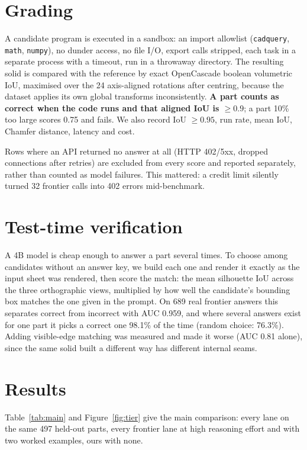 \documentclass[11pt]{article}
\begin{document}
\section{Grading}
\label{sec:grading}

A candidate program is executed in a sandbox: an import allowlist (\texttt{cadquery}, \texttt{math},
\texttt{numpy}), no dunder access, no file I/O, export calls stripped, each task in a separate process with a
timeout, run in a throwaway directory. The resulting solid is compared with the reference by exact OpenCascade
boolean volumetric IoU, maximised over the 24 axis-aligned rotations after centring, because the dataset applies its
own global transforms inconsistently. \textbf{A part counts as correct when the code runs and that aligned IoU is
$\ge0.9$}; a part 10\% too large scores 0.75 and fails. We also record IoU $\ge 0.95$, run rate, mean IoU, Chamfer
distance, latency and cost.

Rows where an API returned no answer at all (HTTP 402/5xx, dropped connections after retries) are excluded from every
score and reported separately, rather than counted as model failures. This mattered: a credit limit silently turned
32 frontier calls into 402 errors mid-benchmark.

\section{Test-time verification}

A 4B model is cheap enough to answer a part several times. To choose among candidates without an answer key, we build
each one and render it exactly as the input sheet was rendered, then score the match: the mean silhouette IoU across
the three orthographic views, multiplied by how well the candidate's bounding box matches the one given in the
prompt. On 689 real frontier answers this separates correct from incorrect with AUC 0.959, and where several answers
exist for one part it picks a correct one 98.1\% of the time (random choice: 76.3\%). Adding visible-edge matching
was measured and made it worse (AUC 0.81 alone), since the same solid built a different way has different internal
seams.

\section{Results}

Table~\ref{tab:main} and Figure~\ref{fig:tier} give the main comparison: every lane on the same 497 held-out parts,
every frontier lane at high reasoning effort and with two worked examples, ours with none.
\end{document}
